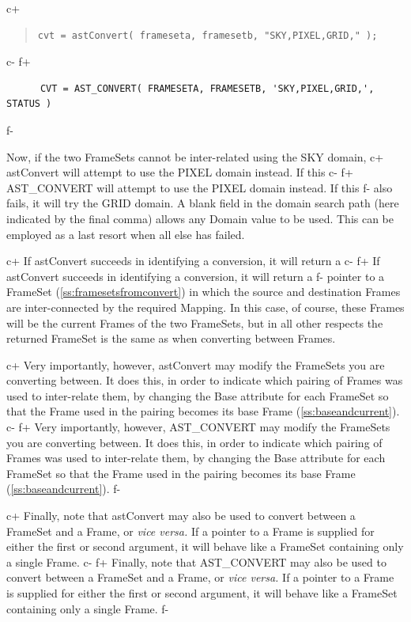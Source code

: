 \documentclass[twoside,11pt]{article}
\newcommand{\secref}[1]{\S\ref{#1}}
\renewcommand{\secref}[1]{\ref{#1}}
\begin{document}
c+
\begin{quote}
\small
\begin{verbatim}
cvt = astConvert( frameseta, framesetb, "SKY,PIXEL,GRID," );
\end{verbatim}
\normalsize
\end{quote}
c-
f+
\small
\begin{verbatim}
      CVT = AST_CONVERT( FRAMESETA, FRAMESETB, 'SKY,PIXEL,GRID,', STATUS )
\end{verbatim}
\normalsize
f-

Now, if the two FrameSets cannot be inter-related using the SKY domain,
c+
astConvert will attempt to use the PIXEL domain instead. If this
c-
f+
AST\_CONVERT will attempt to use the PIXEL domain instead. If this
f-
also fails, it will try the GRID domain. A blank field in the domain
search path (here indicated by the final comma) allows any Domain
value to be used. This can be employed as a last resort when all else
has failed.

c+
If astConvert succeeds in identifying a conversion, it will return a
c-
f+
If astConvert succeeds in identifying a conversion, it will return a
f-
pointer to a FrameSet (\secref{ss:framesetsfromconvert}) in which the
source and destination Frames are inter-connected by the required
Mapping. In this case, of course, these Frames will be the current
Frames of the two FrameSets, but in all other respects the returned
FrameSet is the same as when converting between Frames.

c+
Very importantly, however, astConvert may modify the FrameSets you are
converting between. It does this, in order to indicate which pairing
of Frames was used to inter-relate them, by changing the Base
attribute for each FrameSet so that the Frame used in the pairing
becomes its base Frame (\secref{ss:baseandcurrent}).
c-
f+
Very importantly, however, AST\_CONVERT may modify the FrameSets you
are converting between. It does this, in order to indicate which
pairing of Frames was used to inter-relate them, by changing the Base
attribute for each FrameSet so that the Frame used in the pairing
becomes its base Frame (\secref{ss:baseandcurrent}).
f-

c+
Finally, note that astConvert may also be used to convert between a
FrameSet and a Frame, or {\em{vice versa.}} If a pointer to a Frame is
supplied for either the first or second argument, it will behave like
a FrameSet containing only a single Frame.
c-
f+
Finally, note that AST\_CONVERT may also be used to convert between a
FrameSet and a Frame, or {\em{vice versa.}} If a pointer to a Frame is
supplied for either the first or second argument, it will behave like
a FrameSet containing only a single Frame.
f-
\end{document}
